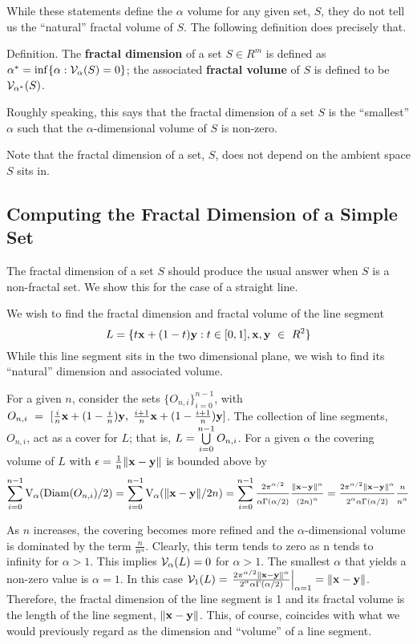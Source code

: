 {While these statements define the $\alpha$ volume for any given set, $S$,
they do not tell us the ``natural'' fractal volume of $S$.
The following definition does precisely that.

\proclaim Definition. The {\bf fractal dimension} of a 
set $S \in R^m$ is defined as
$\alpha^* = \inf\{\alpha : {\cal V}_\alpha(S) = 0 \}$; the associated 
{\bf fractal volume} of $S$ is defined to be ${\cal V}_{\alpha^*}(S)$.

Roughly speaking, this says that the fractal dimension of a set $S$ is the
``smallest'' $\alpha$ such that the $\alpha$-dimensional volume of $S$ 
is non-zero.

Note that the fractal dimension of a set, $S$, does not depend on 
the ambient space $S$ sits in.

\subsection{Computing the Fractal Dimension of a Simple Set}

The fractal dimension of a set $S$ should produce the usual
answer when $S$ is a non-fractal set. We show this for the case of a
straight line.

We wish to find the fractal dimension and fractal volume of the line
segment 
$$
L = \{t{\bf x} + (1-t){\bf y} : t \in [0,1] , {\bf x, y}~\in~R^2\}
$$
While this line segment sits in the two dimensional plane, we wish 
to find its ``natural'' dimension and associated volume.

For a given $n$, consider the sets $\{O_{n,i}\}_{i=0}^{n-1}$, with $O_{n,i}~=~
[\frac{i}{n}{\bf x} + (1-\frac{i}{n}){\bf y}, \; \frac{i+1}{n}{\bf x} + (1 -
\frac{i+1}{n}){\bf y}]$. The collection of line segments, $O_{n,i}$, act
as a cover for $L$; that is, $L =
\bigcup_{i=0}^{n-1}\limits O_{n,i}$. For a given $\alpha$ the
covering volume of $L$ with $\epsilon = \frac{1}{n} \|{\bf x} - {\bf y}\|$ 
is bounded above by
$$
\sum_{i=0}^{n-1} {\rm V}_\alpha({\rm Diam}(O_{n,i})/2) = \sum_{i=0}^{n-1}
{\rm V}_\alpha(\|{\bf x} - {\bf y}\|/2n) =  \sum_{i=0}^{n-1} \frac{2
\pi^{\alpha / 2}}{\alpha \Gamma(\alpha / 2)} \frac{\|{\bf x} - {\bf
y}\|^\alpha}{(2n)^\alpha} = \frac{2 \pi^{\alpha / 2} \|{\bf x} - {\bf
y}\|^\alpha}{2^\alpha \alpha \Gamma(\alpha / 2)} \frac{n}{n^\alpha}
$$

As $n$ increases, the covering becomes more refined and 
the $\alpha$-dimensional volume is dominated by the term
$\frac{n}{n^\alpha}$. Clearly, this term tends to zero as n tends to
infinity for $\alpha > 1$. This implies ${\cal V}_\alpha(L) = 0$ 
for $\alpha > 1$. The smallest $\alpha$ that yields a non-zero 
value is $\alpha = 1$. In this case 
${\cal V}_1(L) = \left. \frac{2\pi^{\alpha / 2} \|{\bf x} - {\bf
y}\|^\alpha}{2^\alpha \alpha \Gamma(\alpha / 2)} \right|_{\alpha=1} = \| {\bf
x} - {\bf y}\|$. 
Therefore, the fractal dimension of the line segment is
1 and its fractal volume is the length of the line segment, $\|{\bf x} - {\bf
y}\|$. This, of course, coincides with what we would previously regard
as the dimension and ``volume'' of a line segment.

}
